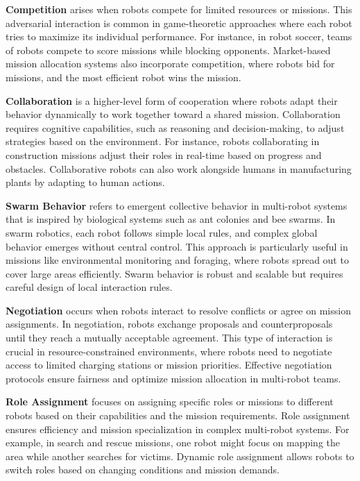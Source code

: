 \documentclass{book}
\begin{document}
\textbf{Competition} arises when robots compete for limited resources or missions. This adversarial interaction is common in game-theoretic approaches where each robot tries to maximize its individual performance. For instance, in robot soccer, teams of robots compete to score missions while blocking opponents. Market-based mission allocation systems also incorporate competition, where robots bid for missions, and the most efficient robot wins the mission.

\textbf{Collaboration} is a higher-level form of cooperation where robots adapt their behavior dynamically to work together toward a shared mission. Collaboration requires cognitive capabilities, such as reasoning and decision-making, to adjust strategies based on the environment. For instance, robots collaborating in construction missions adjust their roles in real-time based on progress and obstacles. Collaborative robots can also work alongside humans in manufacturing plants by adapting to human actions.

\textbf{Swarm Behavior} refers to emergent collective behavior in multi-robot systems that is inspired by biological systems such as ant colonies and bee swarms. In swarm robotics, each robot follows simple local rules, and complex global behavior emerges without central control. This approach is particularly useful in missions like environmental monitoring and foraging, where robots spread out to cover large areas efficiently. Swarm behavior is robust and scalable but requires careful design of local interaction rules.

\textbf{Negotiation} occurs when robots interact to resolve conflicts or agree on mission assignments. In negotiation, robots exchange proposals and counterproposals until they reach a mutually acceptable agreement. This type of interaction is crucial in resource-constrained environments, where robots need to negotiate access to limited charging stations or mission priorities. Effective negotiation protocols ensure fairness and optimize mission allocation in multi-robot teams.

\textbf{Role Assignment} focuses on assigning specific roles or missions to different robots based on their capabilities and the mission requirements. Role assignment ensures efficiency and mission specialization in complex multi-robot systems. For example, in search and rescue missions, one robot might focus on mapping the area while another searches for victims. Dynamic role assignment allows robots to switch roles based on changing conditions and mission demands.
\end{document}
